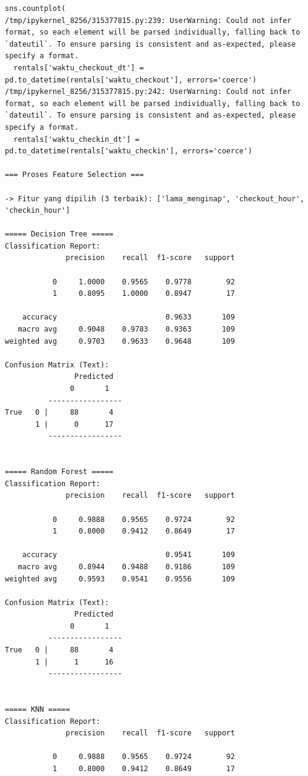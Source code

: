 \begin{lstlisting}[caption={Output 22}]
  sns.countplot(
/tmp/ipykernel_8256/315377815.py:239: UserWarning: Could not infer format, so each element will be parsed individually, falling back to `dateutil`. To ensure parsing is consistent and as-expected, please specify a format.
  rentals['waktu_checkout_dt'] = pd.to_datetime(rentals['waktu_checkout'], errors='coerce')
/tmp/ipykernel_8256/315377815.py:242: UserWarning: Could not infer format, so each element will be parsed individually, falling back to `dateutil`. To ensure parsing is consistent and as-expected, please specify a format.
  rentals['waktu_checkin_dt'] = pd.to_datetime(rentals['waktu_checkin'], errors='coerce')

=== Proses Feature Selection ===

-> Fitur yang dipilih (3 terbaik): ['lama_menginap', 'checkout_hour', 'checkin_hour']

===== Decision Tree =====
Classification Report:
              precision    recall  f1-score   support

           0     1.0000    0.9565    0.9778        92
           1     0.8095    1.0000    0.8947        17

    accuracy                         0.9633       109
   macro avg     0.9048    0.9783    0.9363       109
weighted avg     0.9703    0.9633    0.9648       109

Confusion Matrix (Text):
                Predicted
               0       1
          -----------------
True   0 |     88       4
       1 |      0      17
          -----------------


===== Random Forest =====
Classification Report:
              precision    recall  f1-score   support

           0     0.9888    0.9565    0.9724        92
           1     0.8000    0.9412    0.8649        17

    accuracy                         0.9541       109
   macro avg     0.8944    0.9488    0.9186       109
weighted avg     0.9593    0.9541    0.9556       109

Confusion Matrix (Text):
                Predicted
               0       1
          -----------------
True   0 |     88       4
       1 |      1      16
          -----------------


===== KNN =====
Classification Report:
              precision    recall  f1-score   support

           0     0.9888    0.9565    0.9724        92
           1     0.8000    0.9412    0.8649        17


\end{lstlisting}
